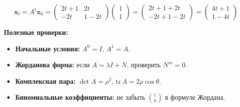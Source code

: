 {$$\mathbf{x}_t = A^t\mathbf{x}_0 = \begin{pmatrix} 2t+1 & 2t \\ -2t & 1-2t \end{pmatrix}\begin{pmatrix} 1 \\ 1 \end{pmatrix} = \begin{pmatrix} 2t+1 + 2t \\ -2t + 1-2t \end{pmatrix} = \begin{pmatrix} 4t + 1 \\ 1 - 4t \end{pmatrix}$$
}


\textbf{Полезные проверки:}
\begin{itemize}
\item \textbf{Начальные условия:} $A^0 = I$, $A^1 = A$.
\item \textbf{Жорданова форма:} если $A = \lambda I + N$, проверить $N^m = 0$.
\item \textbf{Комплексная пара:} $\det A = \rho^2$, $\text{tr}\,A = 2\rho\cos\theta$.
\item \textbf{Биномиальные коэффициенты:} не забыть $\binom{t}{k}$ в формуле Жордана.
\end{itemize}

